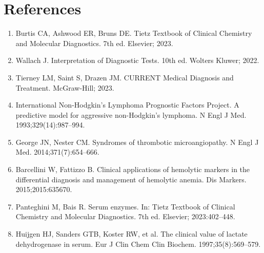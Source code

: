 \section*{References}
\begin{enumerate}
  \item Burtis CA, Ashwood ER, Bruns DE. Tietz Textbook of Clinical Chemistry and Molecular Diagnostics. 7th ed. Elsevier; 2023.
  \item Wallach J. Interpretation of Diagnostic Tests. 10th ed. Wolters Kluwer; 2022.
  \item Tierney LM, Saint S, Drazen JM. CURRENT Medical Diagnosis and Treatment. McGraw-Hill; 2023.
  \item International Non-Hodgkin's Lymphoma Prognostic Factors Project. A predictive model for aggressive non-Hodgkin's lymphoma. N Engl J Med. 1993;329(14):987--994.
  \item George JN, Nester CM. Syndromes of thrombotic microangiopathy. N Engl J Med. 2014;371(7):654--666.
  \item Barcellini W, Fattizzo B. Clinical applications of hemolytic markers in the differential diagnosis and management of hemolytic anemia. Dis Markers. 2015;2015:635670.
  \item Panteghini M, Bais R. Serum enzymes. In: Tietz Textbook of Clinical Chemistry and Molecular Diagnostics. 7th ed. Elsevier; 2023:402--448.
  \item Huijgen HJ, Sanders GTB, Koster RW, et al. The clinical value of lactate dehydrogenase in serum. Eur J Clin Chem Clin Biochem. 1997;35(8):569--579.
\end{enumerate}

\clearpage

